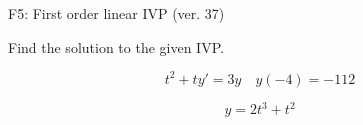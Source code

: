 \begin{exercise}
  \begin{exerciseTitle}F5: First order linear IVP (ver. 37)\end{exerciseTitle}
  \begin{exerciseStatement}
    
Find the solution to the given IVP.

    
\[t^{2} +ty'= 3 y \hspace{1em} y( -4 ) = -112\]

  \end{exerciseStatement}
  \begin{exerciseAnswer}
    
\[y= 2 t^ 3 + t^{2}\]

  \end{exerciseAnswer}
\end{exercise}